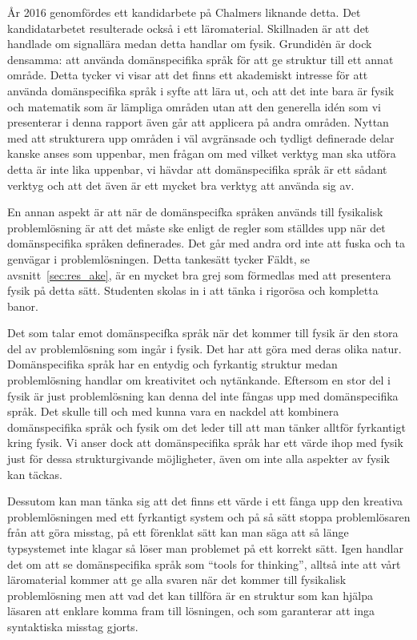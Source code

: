 \begin{draft}
År 2016 genomfördes ett kandidarbete på Chalmers liknande detta. \cite{kandidat2016}
Det kandidatarbetet resulterade också i ett läromaterial. Skillnaden är att det
handlade om signallära medan detta handlar om fysik. Grundidėn är dock densamma:
att använda domänspecifika språk för att ge struktur till ett annat område.
Detta tycker vi visar att det finns ett akademiskt intresse för att använda
domänspecifika språk i syfte att lära ut, och att det inte bara är fysik och
matematik som är lämpliga områden utan att den generella idén som vi presenterar
i denna rapport även går att applicera på andra områden. Nyttan med att
strukturera upp områden i väl avgränsade och tydligt definerade delar kanske
anses som uppenbar, men frågan om med vilket verktyg man ska utföra detta är
inte lika uppenbar, vi hävdar att domänspecifika språk är ett sådant verktyg och
att det även är ett mycket bra verktyg att använda sig av.

En annan aspekt är att när de domänspecifka språken används till fysikalisk
problemlösning är att det måste ske enligt de regler som ställdes upp när det
domänspecifika språken definerades. Det går med andra ord inte att fuska och ta
genvägar i problemlösningen. Detta tankesätt tycker Fäldt, se
avsnitt~\ref{sec:res_ake}, är en mycket bra grej som förmedlas med att
presentera fysik på detta sätt. Studenten skolas in i att tänka i rigorösa och
kompletta banor.

Det som talar emot
domänspecifka språk när det kommer till fysik är den stora del av problemlösning
som ingår i fysik. Det har att göra med deras olika natur. Domänspecifika språk
har en entydig och fyrkantig struktur medan problemlösning handlar om
kreativitet och nytänkande. Eftersom en stor del i fysik är just problemlösning
kan denna del inte fångas upp med domänspecifika språk. Det skulle till och med
kunna vara en nackdel att kombinera domänspecifika språk och fysik om det leder
till att man tänker alltför fyrkantigt kring fysik. Vi anser dock att
domänspecifika språk har ett värde ihop med fysik just för dessa strukturgivande
möjligheter, även om inte alla aspekter av fysik kan täckas. 

Dessutom kan man
tänka sig att det finns ett värde i ett fånga upp den kreativa problemlösningen
med ett fyrkantigt system och på så sätt stoppa problemlösaren från att göra
misstag, på ett förenklat sätt kan man säga att så länge typsystemet inte klagar
så löser man problemet på ett korrekt sätt. Igen handlar det om att se
domänspecifika språk som ``tools for thinking'', alltså inte att vårt
läromaterial kommer att ge alla svaren när det kommer till fysikalisk
problemlösning men att vad det kan tillföra är en struktur som kan hjälpa
läsaren att enklare komma fram till lösningen, och som garanterar att inga
syntaktiska misstag gjorts.


\end{draft}
